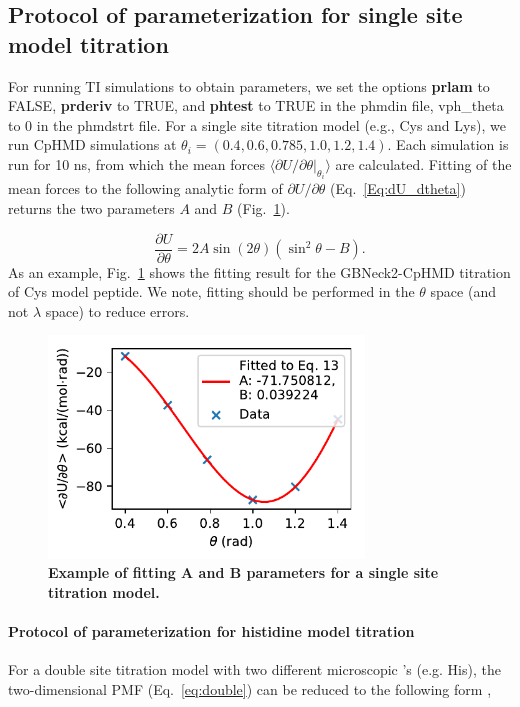 \subsection{Protocol of parameterization for single site model titration}
For running TI simulations to obtain parameters, we set the options \textbf{prlam} to FALSE, \textbf{prderiv} to TRUE, and \textbf{phtest} to TRUE in the phmdin file, vph{\_}theta to 0 in the phmdstrt file.
For a single site titration model (e.g., Cys and Lys), 
we run CpHMD simulations at
$\theta_i=\left(0.4,0.6,0.785,1.0,1.2,1.4\right)$.
Each simulation is run for 10 ns, from which the mean forces
$\langle\partial U/\partial\theta|_{\theta_i}\rangle$
are calculated. 
Fitting of the mean forces  
to the following analytic form of $\partial U/\partial\theta$ (Eq.~\ref{Eq:dU_dtheta}) returns the two parameters $A$ and $B$ (Fig.~\ref{Fig:parm_cys}).

\begin{equation}
    \frac{\partial U}{\partial\theta}=2A\sin\left(2\theta\right)\left(\sin^{2}\theta-B\right).
    \label{Eq:dU_dtheta}
\end{equation}
As an example, Fig.~\ref{Fig:parm_cys} shows the fitting result for the GBNeck2-CpHMD titration of  Cys model peptide.
We note, fitting should be performed in the $\theta$ space (and not $\lambda$ space) to reduce errors.
\begin{figure}[htb!]
    \centering
    \includegraphics[width=3.3in]{figs/cys_parm.pdf}
    \caption{\textbf{Example of fitting A and B parameters for a single site titration model.}
    }
\label{Fig:parm_cys}
\end{figure}

\paragraph{Protocol of parameterization for histidine model titration}
For a double site titration model 
with two different microscopic \pka's
(e.g. His), the two-dimensional PMF (Eq.~\ref{eq:double}) can be reduced to the
following form
\cite{Khandogin_Brooks_2005_Biophys.J.},

